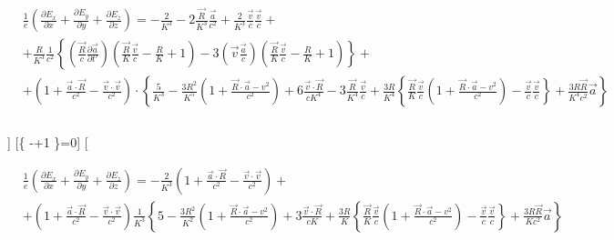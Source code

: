 \documentclass[11pt]{article}
\begin{document}
\begin{align}
  & \frac{1}{e}\left( \frac{\partial {{E}_{x}}}{\partial x}+\frac{\partial {{E}_{y}}}{\partial y}+\frac{\partial {{E}_{z}}}{\partial z} \right)=-\frac{2}{{{K}^{3}}}-2\frac{\overrightarrow{R}}{{{K}^{3}}}\frac{\overrightarrow{a}}{{{c}^{2}}}+\frac{2}{{{K}^{3}}}\frac{\overrightarrow{v}}{c}\frac{\overrightarrow{v}}{c}+ \\ 
 & +\frac{R}{{{K}^{3}}}\frac{1}{{{c}^{2}}}\left\{ \left( \frac{\overrightarrow{R}}{c}\frac{\partial \overrightarrow{a}}{\partial t'} \right)\left( \frac{\overrightarrow{R}}{K}\frac{\overrightarrow{v}}{c}-\frac{R}{K}+1 \right)-3\left( \overrightarrow{v}\frac{\overrightarrow{a}}{c} \right)\left( \frac{\overrightarrow{R}}{K}\frac{\overrightarrow{v}}{c}-\frac{R}{K}+1 \right) \right\}+ \\ 
 & +\left( 1+\frac{\overrightarrow{a}\cdot \overrightarrow{R}}{{{c}^{2}}}-\frac{\overrightarrow{v}\cdot \overrightarrow{v}}{{{c}^{2}}} \right)\cdot \left\{ \frac{5}{{{K}^{3}}}-\frac{3{{R}^{2}}}{{{K}^{5}}}\left( 1+\frac{\overrightarrow{R}\cdot \overrightarrow{a}-{{v}^{2}}}{{{c}^{2}}} \right)+6\frac{\overrightarrow{v}\cdot \overrightarrow{R}}{c{{K}^{4}}}-3\frac{\overrightarrow{R}}{{{K}^{4}}}\frac{\overrightarrow{v}}{c}+\frac{3R}{{{K}^{4}}}\left\{ \frac{\overrightarrow{R}}{K}\frac{\overrightarrow{v}}{c}\left( 1+\frac{\overrightarrow{R}\cdot \overrightarrow{a}-{{v}^{2}}}{{{c}^{2}}} \right)-\frac{\overrightarrow{v}}{c}\frac{\overrightarrow{v}}{c} \right\}+\frac{3R\overrightarrow{R}}{{{K}^{4}}{{c}^{2}}}\overrightarrow{a} \right\} \\ 
 &  \\ 
\end{align}

{]} {[}\left\{
-+1
\right\}=0{]} {[}

\begin{align}
  & \frac{1}{e}\left( \frac{\partial {{E}_{x}}}{\partial x}+\frac{\partial {{E}_{y}}}{\partial y}+\frac{\partial {{E}_{z}}}{\partial z} \right)=-\frac{2}{{{K}^{3}}}\left( 1+\frac{\overrightarrow{a}\cdot \overrightarrow{R}}{{{c}^{2}}}-\frac{\overrightarrow{v}\cdot \overrightarrow{v}}{{{c}^{2}}} \right)+ \\ 
 & +\left( 1+\frac{\overrightarrow{a}\cdot \overrightarrow{R}}{{{c}^{2}}}-\frac{\overrightarrow{v}\cdot \overrightarrow{v}}{{{c}^{2}}} \right)\frac{1}{{{K}^{3}}}\left\{ 5-\frac{3{{R}^{2}}}{{{K}^{2}}}\left( 1+\frac{\overrightarrow{R}\cdot \overrightarrow{a}-{{v}^{2}}}{{{c}^{2}}} \right)+3\frac{\overrightarrow{v}\cdot \overrightarrow{R}}{cK}+\frac{3R}{K}\left\{ \frac{\overrightarrow{R}}{K}\frac{\overrightarrow{v}}{c}\left( 1+\frac{\overrightarrow{R}\cdot \overrightarrow{a}-{{v}^{2}}}{{{c}^{2}}} \right)-\frac{\overrightarrow{v}}{c}\frac{\overrightarrow{v}}{c} \right\}+\frac{3R\overrightarrow{R}}{K{{c}^{2}}}\overrightarrow{a} \right\} \\ 
\end{align}
\end{document}

